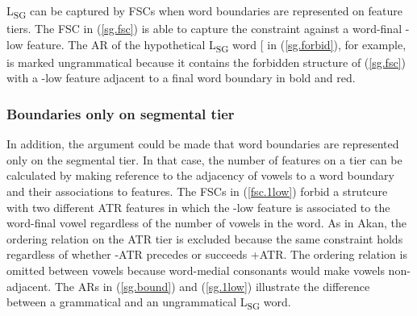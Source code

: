 \documentclass[,doc,floatsintext]{apa6}
\theoremstyle{definition}
\theoremstyle{definition}
\theoremstyle{definition}
\theoremstyle{remark}
\begin{document}
L\textsubscript{SG} can be captured by FSCs when word boundaries are
represented on feature tiers. The FSC in (\ref{sg.fsc}) is able to
capture the constraint against a word-final -low feature. The AR of the
hypothetical L\textsubscript{SG} word {[}\textipa{obIseI}{]} in
(\ref{sg.forbid}), for example, is marked ungrammatical because it
contains the forbidden structure of (\ref{sg.fsc}) with a -low feature
adjacent to a final word boundary in bold and red.

\subsubsection{Boundaries only on segmental
tier}\label{boundaries-only-on-segmental-tier}

In addition, the argument could be made that word boundaries are
represented only on the segmental tier. In that case, the number of
features on a tier can be calculated by making reference to the
adjacency of vowels to a word boundary and their associations to
features. The FSCs in (\ref{fsc.1low}) forbid a strutcure with two
different ATR features in which the -low feature is associated to the
word-final vowel regardless of the number of vowels in the word. As in
Akan, the ordering relation on the ATR tier is excluded because the same
constraint holds regardless of whether -ATR precedes or succeeds +ATR.
The ordering relation is omitted between vowels because word-medial
consonants would make vowels non-adjacent. The ARs in (\ref{sg.bound})
and (\ref{sg.1low}) illustrate the difference between a grammatical and
an ungrammatical L\textsubscript{SG} word.
\end{document}
